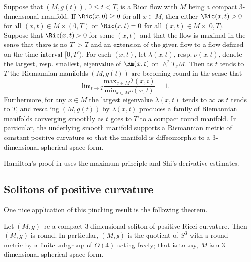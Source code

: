 \begin{theorem}
\label{thm:nonnegative-ricci-flow-becomes-round}
\label{flowtoround}
Suppose that $(M,g(t)),\ 0\le t<T$, is a Ricci flow with $M$ being a
compact $3$-dimensional manifold. If $\Ric(x,0)\ge 0$ for all
$x\in M$, then either $\Ric(x,t)>0$ for all $(x,t)\in M\times
(0,T)$ or $\Ric(x,t)=0$ for all $(x,t)\in M\times[0,T)$.
Suppose that $\Ric(x,t)>0$ for some $(x,t)$ and that the flow
is maximal in the sense that there is no $T'>T$ and an extension of
the given flow to a  flow defined on the time interval $[0,T')$. For
each $(x,t)$, let $\lambda(x,t)$, resp. $\nu(x,t)$, denote the
largest, resp. smallest, eigenvalue of $\Rm(x,t)$ on
$\wedge^2T_xM$. Then as $t$ tends to $T$ the Riemannian manifolds
$(M,g(t))$ are becoming round in the sense that
$$\mathrm{lim}_{t\rightarrow T}\frac{\mathrm{max}_{x\in M}\lambda(x,t)}{\mathrm{min}_{x\in M}\nu(x,t)}=1.$$ Furthermore, for any $x\in M$ the
largest eigenvalue $\lambda(x,t)$ tends to $\infty$ as $t$ tends to
$T$, and rescaling $(M,g(t))$ by $\lambda(x,t)$ produces a family of
Riemannian manifolds converging smoothly as $t$ goes to $T$ to a
compact round manifold. In particular, the underlying smooth
manifold supports a Riemannian metric of constant positive curvature
so that the manifold is diffeomorphic to a $3$-dimensional spherical
space-form.
\end{theorem}

Hamilton's proof in \cite{Hamilton3MPRC} uses the maximum principle
and Shi's derivative estimates.






\subsection{Solitons of positive curvature}

One nice application of this pinching result is the following
theorem.

\begin{theorem}
\label{thm:positive-ricci-soliton-round}\label{sphsf}
Let $(M,g)$ be a compact $3$-dimensional soliton of positive Ricci
curvature. Then $(M,g)$ is round. In particular, $(M,g)$ is the
quotient of $S^3$ with a round metric by a finite subgroup of $O(4)$
acting freely; that is to say, $M$ is a $3$-dimensional spherical
space-form.
\end{theorem}

